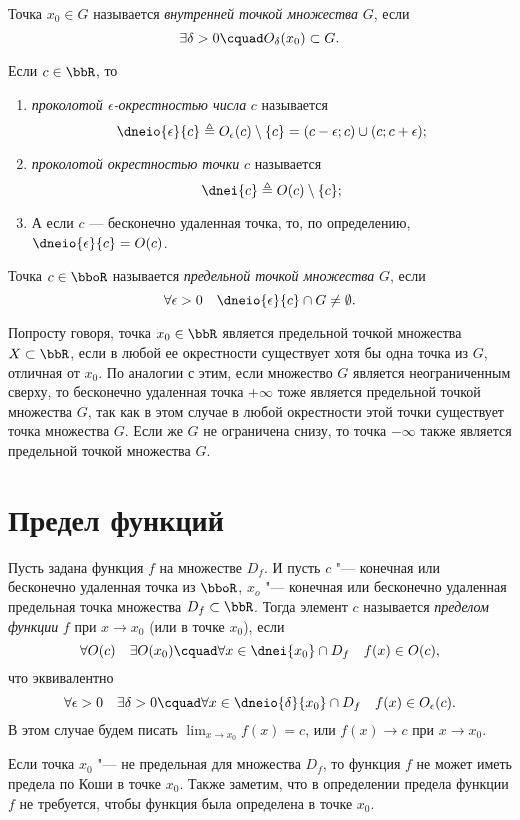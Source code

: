\begin{defn}
Точка $x_0 \in G$ называется \textit{внутренней точкой множества} $G$, если 
$$
\exists \delta >0\cquad O_\delta(x_0) \subset G.
$$
\end{defn}

\begin{defn}
Если $c \in \bbR$, то 
\begin{enumerate}[wide, labelwidth=!, labelindent=0pt, nolistsep]
\item
\textit{проколотой $\epsilon$-окрестностью числа} $c$ называется 
$$
\dneio{\epsilon}{c} \triangleq O_\epsilon(c)\setminus\{c\}=(c-\epsilon;c)\cup(c;c+\epsilon);
$$
\item
\textit{проколотой окрестностью точки} $c$ называется $$\dnei{c} \triangleq O(c)\setminus \{c\};$$
\item[\textbullet]
А если $c$ --- бесконечно удаленная точка, то, по определению, $\dneio{\epsilon}{c}= O (c) $.
\end{enumerate}
\end{defn}

\begin{defn}
Точка $c \in \bboR$ называется \textit{предельной точкой множества} $G$, если $$\forall \epsilon >0 \quad \dneio{\epsilon}{c} \cap G \ne \emptyset.$$
\end{defn}
Попросту говоря, точка $x_0 \in \bbR$ является предельной точкой множества $X \subset \bbR$, если в любой ее окрестности существует хотя бы одна точка из $G$, отличная от $x_0$. По аналогии с этим, если множество $G$ является неограниченным сверху, то бесконечно удаленная точка $+\infty$ тоже является предельной точкой множества $G$, так как в этом случае в любой окрестности этой точки существует точка множества $G$. Если же $G$ не ограничена снизу, то точка $-\infty$ также является предельной точкой множества $G$.

\section{Предел функций}
\begin{defn}\label{df:ch2:predelCaushi}
Пусть задана функция $f$ на множестве $D_f$. И пусть $c$ "--- конечная или бесконечно удаленная точка из $\bboR$, $x_o$ "--- конечная или бесконечно удаленная предельная точка  множества $D_f \subset \bbR$. Тогда элемент $c$ называется \textit{пределом функции} $f$ при $x \to x_0$ (или в точке $x_0$), если
$$
\forall O(c)\quad \exists O(x_0)\cquad \forall x \in \dnei{x_0}\cap D_f\quad f(x) \in O(c),
$$  
что эквивалентно
$$
\forall \epsilon > 0\quad \exists \delta >0\cquad \forall x \in \dneio{\delta}{x_0} \cap D_f\quad f(x) \in O_\epsilon (c). 
$$
В этом случае будем писать $\lim_{x \to x_0}\limits f(x) = c$, или $f(x)\to c$ при $x \to x_0$.
\end{defn}
Если точка $x_0$ "--- не предельная для множества $D_f$, то функция $f$ не может иметь предела по Коши в точке $x_0$. Также заметим, что в определении предела функции $f$ не требуется, чтобы функция была определена в точке $x_0$.

